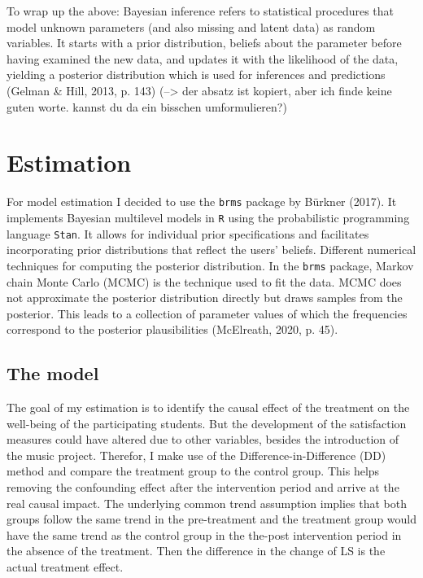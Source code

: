 \documentclass[a4, 12pt]{article}
\begin{document}
To wrap up the above: Bayesian inference refers to statistical procedures that model unknown parameters (and also missing and latent data) as random variables. It starts with a prior distribution, beliefs about the parameter before having examined the new data, and updates it with the likelihood of the data, yielding a posterior distribution which is used for inferences and predictions (Gelman \& Hill, 2013, p. 143) (--\textgreater{} der absatz ist kopiert, aber ich finde keine guten worte. kannst du da ein bisschen umformulieren?)

\hypertarget{estimation}{%
\section{Estimation}\label{estimation}}

\label{ch:estimation}
For model estimation I decided to use the \texttt{brms} package by Bürkner (2017). It implements Bayesian multilevel models in \texttt{R} using the probabilistic programming language \texttt{Stan}. It allows for individual prior specifications and facilitates incorporating prior distributions that reflect the users' beliefs. Different numerical techniques for computing the posterior distribution. In the \texttt{brms} package, Markov chain Monte Carlo (MCMC) is the technique used to fit the data. MCMC does not approximate the posterior distribution directly but draws samples from the posterior. This leads to a collection of parameter values of which the frequencies correspond to the posterior plausibilities (McElreath, 2020, p. 45).

\hypertarget{the-model}{%
\subsection{The model}\label{the-model}}

\label{sec:model}
The goal of my estimation is to identify the causal effect of the treatment on the well-being of the participating students. But the development of the satisfaction measures could have altered due to other variables, besides the introduction of the music project. Therefor, I make use of the Difference-in-Difference (DD) method and compare the treatment group to the control group. This helps removing the confounding effect after the intervention period and arrive at the real causal impact.
The underlying common trend assumption implies that both groups follow the same trend in the pre-treatment and the treatment group would have the same trend as the control group in the the-post intervention period in the absence of the treatment. Then the difference in the change of LS is the actual treatment effect.
\end{document}
